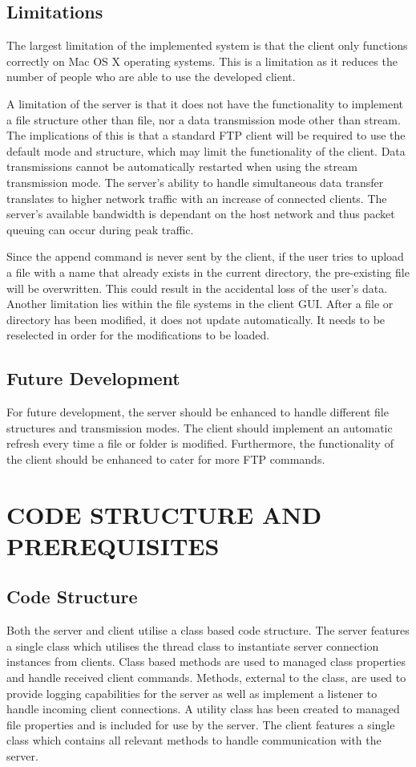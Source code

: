 \documentclass[10pt,twocolumn]{witseiepaper}
\begin{document}
\subsection{Limitations}
The largest limitation of the implemented system is that the client only functions correctly on Mac OS X operating systems. This is a limitation as it reduces the number of people who are able to use the developed client.

A limitation of the server is that it does not have the functionality to implement a file structure other than file, nor a data transmission mode other than stream. The implications of this is that a standard FTP client will be required to use the default mode and structure, which may limit the functionality of the client. Data transmissions cannot be automatically restarted when using the stream transmission mode. The server's ability to handle simultaneous data transfer translates to higher network traffic with an increase of connected clients. The server's available bandwidth is dependant on the host network and thus packet queuing can occur during peak traffic.

Since the append command is never sent by the client, if the user tries to upload a file with a name that already exists in the current directory, the pre-existing file will be overwritten. This could result in the accidental loss of the user's data. Another limitation lies within the file systems in the client GUI. After a file or directory has been modified, it does not update automatically. It needs to be reselected in order for the modifications to be loaded.

\subsection{Future Development}
For future development, the server should be enhanced to handle different file structures and transmission modes. The client should implement an automatic refresh every time a file or folder is modified. Furthermore, the functionality of the client should be enhanced to cater for more FTP commands.

\section{CODE STRUCTURE AND PREREQUISITES}

\subsection{Code Structure}
Both the server and client utilise a class based code structure. The server features a single class which utilises the thread class to instantiate server connection instances from clients. Class based methods are used to managed class properties and handle received client commands. Methods, external to the class, are used to provide logging capabilities for the server as well as implement a listener to handle incoming client connections. A utility class has been created to managed file properties and is included for use by the server. The client features a single class which contains all relevant methods to handle communication with the server.
\end{document}
